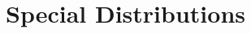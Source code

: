 \documentclass[../main.tex]{subfiles}
\begin{document}
\chapter{Special Distributions}
%	
	
	
	
	
\end{document}
